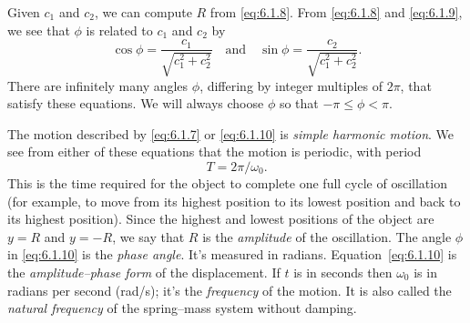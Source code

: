 \documentclass{ximera}
\begin{document}
\begin{center}
\end{center}

 
Given $c_1$ and
$c_2$, we can compute $R$ from \eqref{eq:6.1.8}. From \eqref{eq:6.1.8} and
\eqref{eq:6.1.9}, we see that $\phi$ is related to $c_1$ and $c_2$ by
$$
\cos\phi=\frac{c_1}{\sqrt{c_1^2+c_2^2}}\quad\mbox{and}\quad\sin\phi=
\frac{c_2}{\sqrt{c_1^2+c_2^2}}.
$$
There are infinitely many angles $\phi$, differing
 by integer multiples of $2\pi$, that satisfy these equations. We
will always choose $\phi$ so that $-\pi\leq\phi<\pi$.
 
 
The motion described by \eqref{eq:6.1.7} or \eqref{eq:6.1.10}
is  \textit{simple harmonic motion}. We see from either of these
equations that the motion is periodic, with period
$$
T=2\pi/\omega_0.
$$
This is the time required for the object to complete one full cycle of
oscillation (for example, to move from its highest position to its
lowest position and back to its highest position). Since the highest
and lowest positions of the object are $y=R$ and $y=-R$, we say that
$R$ is the \textit{amplitude} of the oscillation. The angle $\phi$ in
\eqref{eq:6.1.10} is the \textit{phase angle}. It's measured
in
radians. Equation~\eqref{eq:6.1.10} is the \textit{amplitude--phase
form} of the displacement. If $t$ is in seconds then $\omega_0$ is
in radians per second (rad/s);   it's  the \textit{frequency} of
the motion. It is also called the \textit{natural frequency} of
the spring--mass system without damping.
 
\end{document}
